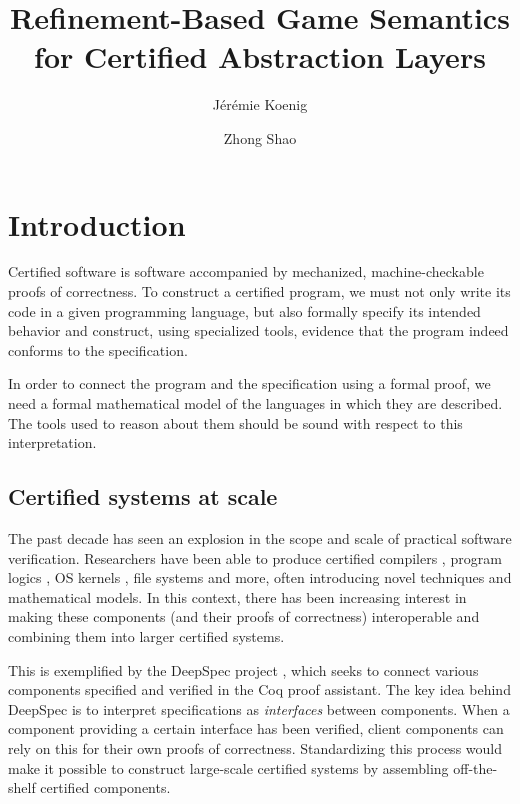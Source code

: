 \documentclass[sigplan,screen]{acmart}
\title{Refinement-Based Game Semantics for Certified Abstraction Layers} %
\author{J\'er\'emie Koenig}
\affiliation{Yale University}
\author{Zhong Shao}
\affiliation{Yale University}
\begin{document}
\maketitle

\section{Introduction} \label{sec:intro} %


Certified software
is software accompanied by
mechanized, machine-checkable proofs of correctness.
To construct a certified program,
we must not only write its code in a given programming language,
but also formally specify its intended behavior
and construct, using specialized tools,
evidence that the program
indeed conforms to the specification.

In order to connect the program and the specification
using a formal proof,
we need a formal mathematical model of
the languages in which they are described.
The tools used to reason about them
should be sound with respect to this interpretation.


\subsection{Certified systems at scale} %

The past decade has seen an explosion
in the scope and scale of practical software verification.
Researchers have been able to produce certified
compilers \cite{compcert},
program logics \cite{vst},
OS kernels \cite{sel4,popl15},
file systems \cite{fscq} and more,
often introducing novel techniques
and mathematical models.
In this context,
there has been increasing interest in
making these components (and their proofs of correctness)
interoperable and
combining them into larger certified systems.

This is exemplified by the DeepSpec project \cite{deepspec},
which seeks to connect various components
specified and verified in the Coq proof assistant.
The key idea behind DeepSpec
is to interpret specifications as \emph{interfaces}
between components.
When a component providing a certain interface
has been verified,
client components can rely on this
for their own proofs of correctness.
Standardizing this process would make it possible
to construct large-scale certified systems
by assembling off-the-shelf certified components.
\end{document}
